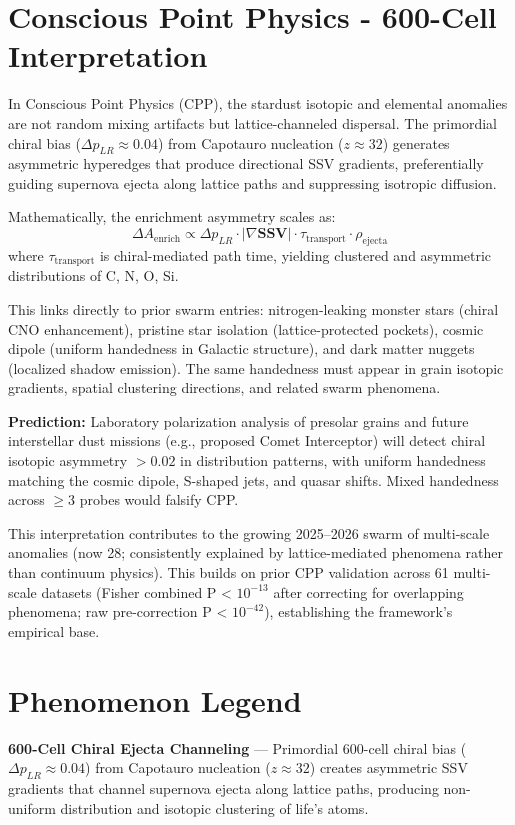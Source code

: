 \documentclass[11pt]{article}
\begin{document}
\section{Conscious Point Physics - 600-Cell Interpretation}
In Conscious Point Physics (CPP), the stardust isotopic and elemental anomalies are not random mixing artifacts but lattice-channeled dispersal. The primordial chiral bias ($\Delta p_{LR} \approx 0.04$) from Capotauro nucleation ($z \approx 32$) generates asymmetric hyperedges that produce directional SSV gradients, preferentially guiding supernova ejecta along lattice paths and suppressing isotropic diffusion.

Mathematically, the enrichment asymmetry scales as:
\[
\Delta A_{\text{enrich}} \propto \Delta p_{LR} \cdot |\nabla \mathbf{SSV}| \cdot \tau_{\text{transport}} \cdot \rho_{\text{ejecta}}
\]
where $\tau_{\text{transport}}$ is chiral-mediated path time, yielding clustered and asymmetric distributions of C, N, O, Si.

This links directly to prior swarm entries: nitrogen-leaking monster stars (chiral CNO enhancement), pristine star isolation (lattice-protected pockets), cosmic dipole (uniform handedness in Galactic structure), and dark matter nuggets (localized shadow emission). The same handedness must appear in grain isotopic gradients, spatial clustering directions, and related swarm phenomena.

\textbf{Prediction:} Laboratory polarization analysis of presolar grains and future interstellar dust missions (e.g., proposed Comet Interceptor) will detect chiral isotopic asymmetry $>0.02$ in distribution patterns, with uniform handedness matching the cosmic dipole, S-shaped jets, and quasar shifts. Mixed handedness across $\geq 3$ probes would falsify CPP.

This interpretation contributes to the growing 2025--2026 swarm of multi-scale anomalies (now 28; consistently explained by lattice-mediated phenomena rather than continuum physics). This builds on prior CPP validation across 61 multi-scale datasets (Fisher combined P < $10^{-13}$ after correcting for overlapping phenomena; raw pre-correction P < $10^{-42}$), establishing the framework's empirical base.

\section{Phenomenon Legend}
\textbf{600-Cell Chiral Ejecta Channeling} — Primordial 600-cell chiral bias ($\Delta p_{LR} \approx 0.04$) from Capotauro nucleation ($z \approx 32$) creates asymmetric SSV gradients that channel supernova ejecta along lattice paths, producing non-uniform distribution and isotopic clustering of life's atoms.
\end{document}
